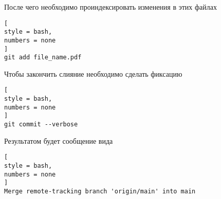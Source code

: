 \documentclass[%
	11pt,
	a4paper,
	utf8,
		]{article}
\begin{document}
После чего необходимо проиндексировать изменения в этих файлах
\begin{lstlisting}[
style = bash,
numbers = none	
]
git add file_name.pdf
\end{lstlisting}

Чтобы закончить слияние необходимо сделать фиксацию
\begin{lstlisting}[
style = bash,
numbers = none	
]
git commit --verbose
\end{lstlisting}

Результатом будет сообщение вида
\begin{lstlisting}[
style = bash,
numbers = none	
]
Merge remote-tracking branch 'origin/main' into main
\end{lstlisting}


\begin{thebibliography}{99}
	
\end{thebibliography}

\end{document}
